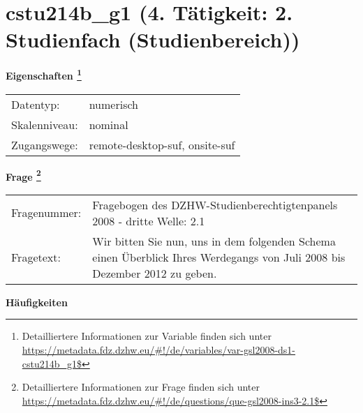 
    \setcounter{footnote}{0}

    \vspace*{-1.8cm}
	\section{cstu214b\_g1 (4. Tätigkeit: 2. Studienfach (Studienbereich))}
	\label{section:cstu214b_g1}



    \vspace*{0.5cm}
    \noindent\textbf{Eigenschaften
	\footnote{Detailliertere Informationen zur Variable finden sich unter
		\url{https://metadata.fdz.dzhw.eu/\#!/de/variables/var-gsl2008-ds1-cstu214b_g1$}}}\\
	\begin{tabularx}{\hsize}{@{}lX}
	Datentyp: & numerisch \\
	Skalenniveau: & nominal \\
	Zugangswege: &
	  remote-desktop-suf, 
	  onsite-suf
 \\
    \end{tabularx}



				\vspace*{0.5cm}
                \noindent\textbf{Frage
	                \footnote{Detailliertere Informationen zur Frage finden sich unter
		              \url{https://metadata.fdz.dzhw.eu/\#!/de/questions/que-gsl2008-ins3-2.1$}}}\\
				\begin{tabularx}{\hsize}{@{}lX}
					Fragenummer: &
					  Fragebogen des DZHW-Studienberechtigtenpanels 2008 - dritte Welle:
					  2.1
 \\
					Fragetext: & Wir bitten Sie nun, uns in dem folgenden Schema einen Überblick Ihres Werdegangs von Juli 2008 bis Dezember 2012 zu geben. \\
				\end{tabularx}





        		\vspace*{0.5cm}
                \noindent\textbf{Häufigkeiten}

